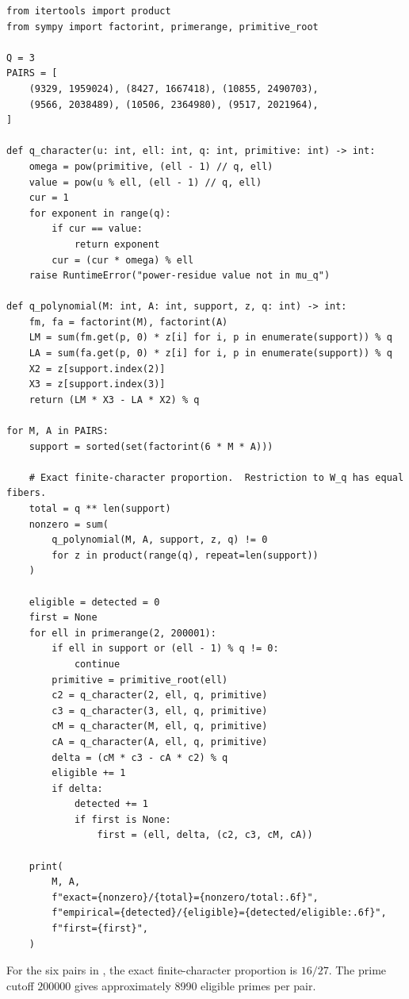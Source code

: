 \documentclass[11pt]{article}
\numberwithin{equation}{section}
\theoremstyle{definition}
\theoremstyle{remark}
\begin{document}
\begin{lstlisting}[style=pythonstyle]
from itertools import product
from sympy import factorint, primerange, primitive_root

Q = 3
PAIRS = [
    (9329, 1959024), (8427, 1667418), (10855, 2490703),
    (9566, 2038489), (10506, 2364980), (9517, 2021964),
]

def q_character(u: int, ell: int, q: int, primitive: int) -> int:
    omega = pow(primitive, (ell - 1) // q, ell)
    value = pow(u % ell, (ell - 1) // q, ell)
    cur = 1
    for exponent in range(q):
        if cur == value:
            return exponent
        cur = (cur * omega) % ell
    raise RuntimeError("power-residue value not in mu_q")

def q_polynomial(M: int, A: int, support, z, q: int) -> int:
    fm, fa = factorint(M), factorint(A)
    LM = sum(fm.get(p, 0) * z[i] for i, p in enumerate(support)) % q
    LA = sum(fa.get(p, 0) * z[i] for i, p in enumerate(support)) % q
    X2 = z[support.index(2)]
    X3 = z[support.index(3)]
    return (LM * X3 - LA * X2) % q

for M, A in PAIRS:
    support = sorted(set(factorint(6 * M * A)))

    # Exact finite-character proportion.  Restriction to W_q has equal fibers.
    total = q ** len(support)
    nonzero = sum(
        q_polynomial(M, A, support, z, q) != 0
        for z in product(range(q), repeat=len(support))
    )

    eligible = detected = 0
    first = None
    for ell in primerange(2, 200001):
        if ell in support or (ell - 1) % q != 0:
            continue
        primitive = primitive_root(ell)
        c2 = q_character(2, ell, q, primitive)
        c3 = q_character(3, ell, q, primitive)
        cM = q_character(M, ell, q, primitive)
        cA = q_character(A, ell, q, primitive)
        delta = (cM * c3 - cA * c2) % q
        eligible += 1
        if delta:
            detected += 1
            if first is None:
                first = (ell, delta, (c2, c3, cM, cA))

    print(
        M, A,
        f"exact={nonzero}/{total}={nonzero/total:.6f}",
        f"empirical={detected}/{eligible}={detected/eligible:.6f}",
        f"first={first}",
    )
\end{lstlisting}

For the six pairs in , the exact finite-character proportion is \(16/27\).
The prime cutoff \(200000\) gives approximately 8990 eligible primes per pair.
\end{document}
